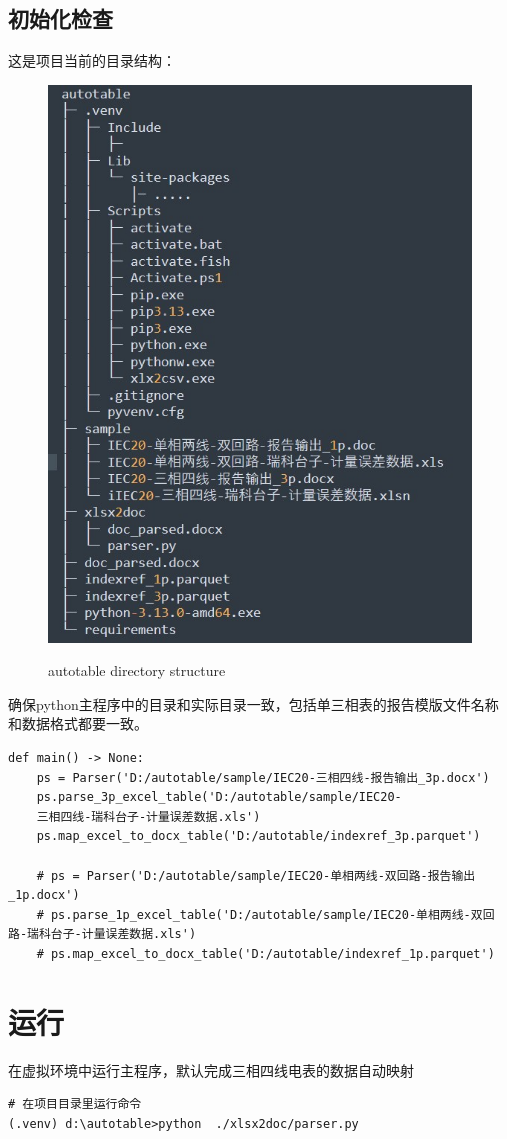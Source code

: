 \subsection{初始化检查}
这是项目当前的目录结构：
\begin{figure}[H]
    \begin{center}
        \includegraphics[width=.5\linewidth]{res/dir.jpg}\\
        \caption{autotable directory structure }\label{dir}
    \end{center}
\end{figure}

确保python主程序中的目录和实际目录一致，包括单三相表的报告模版文件名称和数据格式都要一致。

\begin{verbatim}
def main() -> None:
    ps = Parser('D:/autotable/sample/IEC20-三相四线-报告输出_3p.docx')
    ps.parse_3p_excel_table('D:/autotable/sample/IEC20-
    三相四线-瑞科台子-计量误差数据.xls')
    ps.map_excel_to_docx_table('D:/autotable/indexref_3p.parquet')
    
    # ps = Parser('D:/autotable/sample/IEC20-单相两线-双回路-报告输出_1p.docx')
    # ps.parse_1p_excel_table('D:/autotable/sample/IEC20-单相两线-双回路-瑞科台子-计量误差数据.xls')
    # ps.map_excel_to_docx_table('D:/autotable/indexref_1p.parquet')
\end{verbatim}

\section{运行}

在虚拟环境中运行主程序，默认完成三相四线电表的数据自动映射
\begin{lstlisting}
# 在项目目录里运行命令
(.venv) d:\autotable>python  ./xlsx2doc/parser.py
\end{lstlisting}

